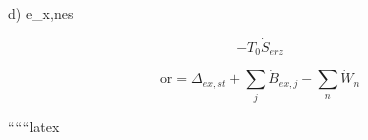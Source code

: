 d)  \quad e_{x,nes}

\[
- T_0 \dot{S}_{erz}
\]

\[
\text{or} = \Delta_{ex,st} + \sum_j \dot{B}_{ex,j} - \sum_n \dot{W}_n
\]

``````latex